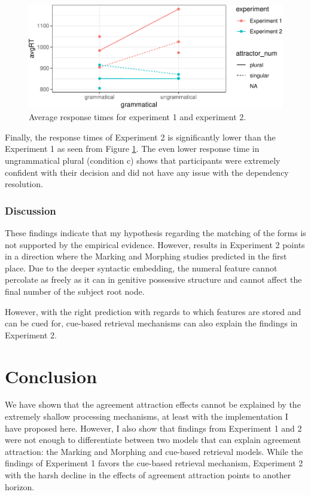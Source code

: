 \documentclass[doc]{apa6}
\begin{document}
\begin{figure}
\centering
\includegraphics{paper_draft_files/figure-latex/exp2AvgRTs-1.pdf}
\caption{\label{fig:exp2AvgRTs}Average response times for experiment 1 and experiment 2.}
\end{figure}

Finally, the response times of Experiment 2 is significantly lower than the Experiment 1 as seen from Figure \ref{fig:exp2AvgRTs}. The even lower response time in ungrammatical plural (condition c) shows that participants were extremely confident with their decision and did not have any issue with the dependency resolution.

\hypertarget{discussion-1}{%
\subsubsection{Discussion}\label{discussion-1}}

These findings indicate that my hypothesis regarding the matching of the forms is not supported by the empirical evidence. However, results in Experiment 2 points in a direction where the Marking and Morphing studies predicted in the first place. Due to the deeper syntactic embedding, the numeral feature cannot percolate as freely as it can in genitive possessive structure and cannot affect the final number of the subject root node.

However, with the right prediction with regards to which features are stored and can be cued for, cue-based retrieval mechanisms can also explain the findings in Experiment 2.

\hypertarget{conclusion}{%
\section{Conclusion}\label{conclusion}}

We have shown that the agreement attraction effects cannot be explained by the extremely shallow processing mechanisms, at least with the implementation I have proposed here. However, I also show that findings from Experiment 1 and 2 were not enough to differentiate between two models that can explain agreement attraction: the Marking and Morphing and cue-based retrieval models. While the findings of Experiment 1 favors the cue-based retrieval mechanism, Experiment 2 with the harsh decline in the effects of agreement attraction points to another horizon.
\end{document}
